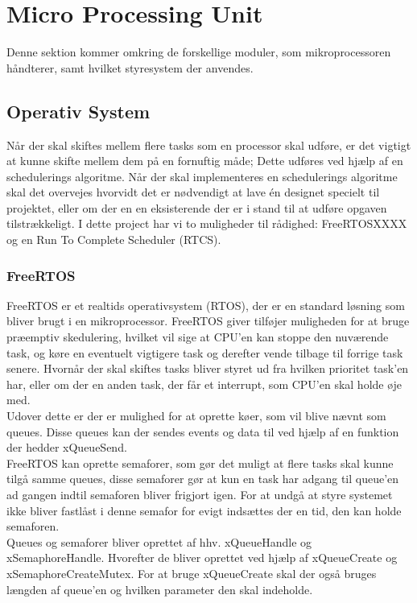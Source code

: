 \section{Micro Processing Unit}
Denne sektion kommer omkring de forskellige moduler, som mikroprocessoren håndterer, samt hvilket styresystem der anvendes.

\subsection{Operativ System}
Når der skal skiftes mellem flere tasks som en processor skal udføre, er det vigtigt at kunne skifte mellem dem på en fornuftig måde; Dette udføres ved hjælp af en schedulerings algoritme. Når der skal implementeres en schedulerings algoritme skal det overvejes hvorvidt det er nødvendigt at lave én designet specielt til projektet, eller om der en en eksisterende der er i stand til at udføre opgaven tilstrækkeligt. I dette project har vi to muligheder til rådighed: FreeRTOS\cite{FreeRTOSorg}XXXX og en Run To Complete Scheduler (RTCS).

\subsubsection{FreeRTOS}

FreeRTOS \cite{FreeRTOSorg} er et realtids operativsystem (RTOS), der er en standard løsning som bliver brugt i en mikroprocessor. FreeRTOS giver tilføjer muligheden for at bruge præemptiv skedulering, hvilket vil sige at CPU'en kan stoppe den nuværende task, og køre en eventuelt vigtigere task og derefter vende tilbage til forrige task senere. Hvornår der skal skiftes tasks bliver styret ud fra hvilken prioritet task'en har, eller om der en anden task, der får et interrupt, som CPU'en skal holde øje med.
\\
Udover dette er der er mulighed for at oprette køer, som vil blive nævnt som queues. Disse queues kan der sendes events og data til ved hjælp af en funktion der hedder xQueueSend. 
\\
FreeRTOS kan oprette semaforer, som gør det muligt at flere tasks skal kunne tilgå samme queues, disse semaforer gør at kun en task har adgang til queue'en ad gangen indtil semaforen bliver frigjort igen. For at undgå at styre systemet ikke bliver fastlåst i denne semafor for evigt indsættes der en tid, den kan holde semaforen.
\\
Queues og semaforer bliver oprettet af hhv. xQueueHandle og xSemaphoreHandle. Hvorefter de bliver oprettet ved hjælp af xQueueCreate og xSemaphoreCreateMutex. For at bruge xQueueCreate skal der også bruges længden af queue'en og hvilken parameter den skal indeholde.
\\

